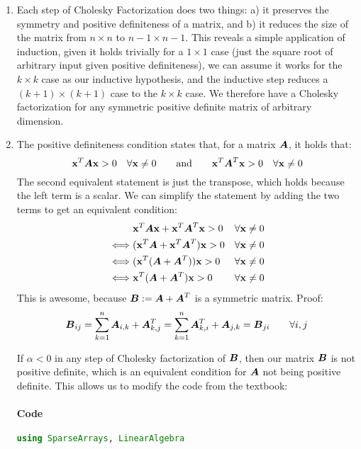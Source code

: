 \documentclass[]{exam}
\let\oldparagraph\paragraph
\renewcommand{\paragraph}[1]{\oldparagraph{#1}\mbox{}}
\begin{document}
\begin{questions}
\newpage
\question
\hfill

\begin{enumerate}[label=\arabic*.]
	\item Each step of Cholesky Factorization does two things: a) it preserves the symmetry and positive definiteness of a matrix, and b) it reduces the size of the matrix from $n \times n$ to $n - 1 \times n - 1$. This reveals a simple application of induction, given it holds trivially for a $1 \times 1$ case (just the square root of arbitrary input given positive definiteness), we can assume it works for the $k \times k$ case as our inductive hypothesis, and the inductive step reduces a $(k + 1) \times (k + 1)$ case to the $k \times k$ case. We therefore have a Cholesky factorization for any symmetric positive definite matrix of arbitrary dimension.
	\item The positive definiteness condition states that, for a matrix $\boldsymbol{A}$, it holds that:
		$$ \boldsymbol{\mathrm{x}}^T \boldsymbol{A} \boldsymbol{\mathrm{x}} > 0 \quad \forall \boldsymbol{\mathrm{x}} \neq 0 \qquad \mathrm{and} \qquad \boldsymbol{\mathrm{x}}^T \boldsymbol{A}^T \boldsymbol{\mathrm{x}} > 0 \quad \forall \boldsymbol{\mathrm{x}} \neq 0$$
		The second equivalent statement is just the transpose, which holds because the left term is a scalar. We can simplify the statement by adding the two terms to get an equivalent condition:
		\begin{align*}
			&\boldsymbol{\mathrm{x}}^T \boldsymbol{A} \boldsymbol{\mathrm{x}} + \boldsymbol{\mathrm{x}}^T \boldsymbol{A}^T \boldsymbol{\mathrm{x}} > 0 & \forall \boldsymbol{\mathrm{x}} \neq 0 \\
			\iff &(\boldsymbol{\mathrm{x}}^T \boldsymbol{A} + \boldsymbol{\mathrm{x}}^T \boldsymbol{A}^T) \boldsymbol{\mathrm{x}} > 0 & \forall \boldsymbol{\mathrm{x}} \neq 0 \\
			\iff &(\boldsymbol{\mathrm{x}}^T (\boldsymbol{A} + \boldsymbol{A}^T)) \boldsymbol{\mathrm{x}} > 0 & \forall \boldsymbol{\mathrm{x}} \neq 0 \\
			\iff &\boldsymbol{\mathrm{x}}^T (\boldsymbol{A} + \boldsymbol{A}^T) \boldsymbol{\mathrm{x}} > 0 & \forall \boldsymbol{\mathrm{x}} \neq 0
		\end{align*}
		This is awesome, because $\boldsymbol{B} := \boldsymbol{A} + \boldsymbol{A}^T$ is a symmetric matrix. Proof:
		\begin{align*}
			\boldsymbol{B}_{ij} = \sum^n_{k=1} \boldsymbol{A}_{i, k} + \boldsymbol{A}^T_{k,j} = \sum^n_{k=1} \boldsymbol{A}^T_{k, i} + \boldsymbol{A}_{j,k} = \boldsymbol{B}_{ji} \qquad \forall i,j
		\end{align*}

		If $\alpha < 0$ in any step of Cholesky factorization of $\boldsymbol{B}$, then our matrix $\boldsymbol{B}$ is not positive definite, which is an equivalent condition for $\boldsymbol{A}$ not being positive definite. This allows us to modify the code from the textbook:
		\paragraph{Code}
\begin{lstlisting}[language=julia]
using SparseArrays, LinearAlgebra


\end{lstlisting}
\end{enumerate}
\end{questions}
\end{document}

